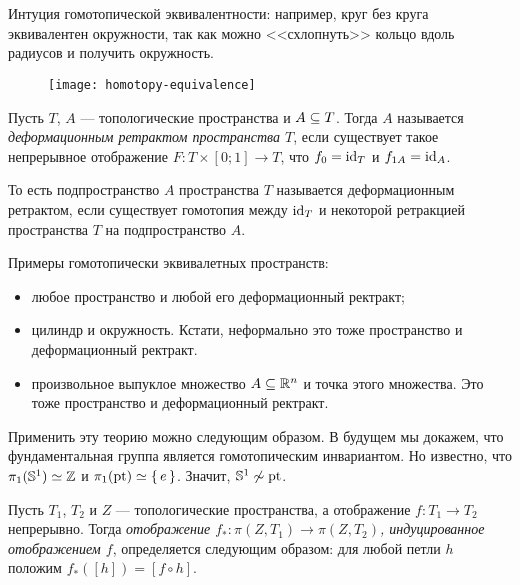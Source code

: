 \documentclass[main]{subfiles}
\begin{document}
\resetcounters

\section{}

Интуция гомотопической эквивалентности: например, круг без круга эквивалентен окружности, так как можно
<<схлопнуть>> кольцо вдоль радиусов и получить окружность.

\begin{figure}[H]
	\centering \texttt{[image: homotopy-equivalence]}
\end{figure}

\begin{definition}
	Пусть $ T $, $ A $ --- топологические пространства и $ A \subseteq T $. Тогда $ A $ называется \emph{деформационным
	ретрактом пространства $ T $}, если существует такое непрерывное отображение $ F \colon T \times [0; 1] \to T $,
	что $ f_0 = \operatorname{id}_T $ и $ f_{1 A} = \operatorname{id}_A $.
\end{definition}

\begin{remark}
	То есть подпространство $ A $ пространства $ T $ называется деформационным ретрактом, если существует гомотопия
	между $ \operatorname{id}_T $ и некоторой ретракцией пространства $ T $ на подпространство $ A $.
\end{remark}

\begin{example} Примеры гомотопически эквивалетных пространств:
	\begin{itemize}
		\item любое пространство и любой его деформационный ректракт;
		\item цилиндр и окружность. Кстати, неформально это тоже пространство и деформационный ректракт.
		\item произвольное выпуклое множество $ A \subseteq \mathbb{R}^n $ и точка этого множества. Это тоже пространство и
			деформационный ректракт.
	\end{itemize}
\end{example}

\begin{example}
	Применить эту теорию можно следующим образом. В будущем мы докажем, что фундаментальная группа является
	гомотопическим инвариантом. Но известно, что $ \pi_1(\mathbb{S}^1) \simeq \mathbb{Z} $ и $ \pi_1(\operatorname{pt}) \simeq \left\{\,e\,\right\} $.
	Значит, $ \mathbb{S}^1 \not \sim \operatorname{pt} $.
\end{example}

\begin{definition}
	Пусть $ T_1 $, $ T_2 $ и $ Z $ --- топологические пространства, а отображение $ f \colon T_1 \to T_2 $ непрерывно.
	Тогда \emph{отображение $ f_* \colon \pi(Z, T_1) \to \pi(Z, T_2) $, индуцированное отображением $ f $},
	определяется следующим образом: для любой петли $ h $ положим $ f_*([h]) = [f \circ h] $.
\end{definition}
\end{document}
